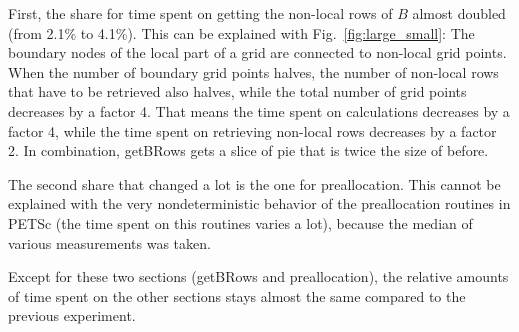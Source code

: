 First, the share for time spent on getting the non-local rows of $B$ almost doubled (from 2.1\% to 4.1\%). This can be explained with Fig.~\ref{fig:large_small}: The boundary nodes of the local part of a grid are connected to non-local grid points. When the number of boundary grid points halves, the number of non-local rows that have to be retrieved also halves, while the total number of grid points decreases by a factor 4. That means the time spent on calculations decreases by a factor 4, while the time spent on retrieving non-local rows decreases by a factor 2. In combination, getBRows gets a slice of pie that is twice the size of before. 

The second share that changed a lot is the one for preallocation. This cannot be explained with the very nondeterministic behavior of the preallocation routines in PETSc (the time spent on this routines varies a lot), because the median of various measurements was taken. 

Except for these two sections (getBRows and preallocation), the relative amounts of time spent on the other sections stays almost the same compared to the previous experiment.

